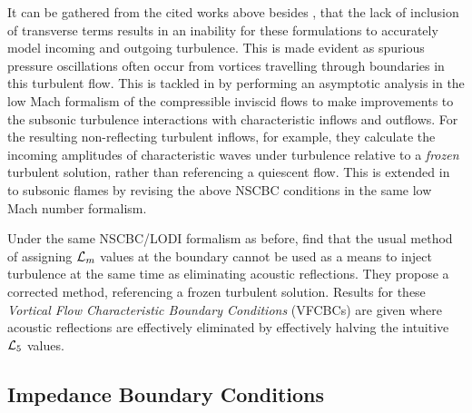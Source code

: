 It can be gathered from the cited works above besides \cite{yoo2007CharacteristicBoundaryConditions}, that the lack of inclusion of transverse terms results in an inability for these formulations to accurately model incoming and outgoing turbulence. This is made evident as spurious pressure oscillations often occur from vortices travelling through boundaries in this turbulent flow. This is tackled in \cite{prosser2005ImprovedBoundaryConditions} by performing an asymptotic analysis in the low Mach formalism of the compressible inviscid flows to make improvements to the subsonic turbulence interactions with characteristic inflows and outflows. For the resulting non-reflecting turbulent inflows, for example, they calculate the incoming amplitudes of characteristic waves under turbulence relative to a \emph{frozen} turbulent solution, rather than referencing a quiescent flow. This is extended in \cite{prosser2011ImprovedBoundaryConditions} to subsonic flames by revising the above NSCBC conditions in the same low Mach number formalism.

Under the same NSCBC/LODI formalism as before, \cite{guezennec2009AcousticallyNonreflectingReflecting} find that the usual method of assigning $\mathcal{L}_m$ values at the boundary cannot be used as a means to inject turbulence at the same time as eliminating acoustic reflections. They propose a corrected method, referencing a frozen turbulent solution. Results for these \emph{Vortical Flow Characteristic Boundary Conditions} (VFCBCs) are given where acoustic reflections are effectively eliminated by effectively halving the intuitive $\mathcal{L}_5$ values.









\subsection{Impedance Boundary Conditions}

